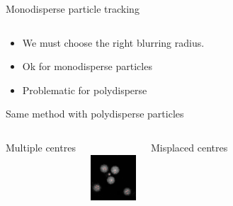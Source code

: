 \documentclass[xcolor=table]{beamer}
\begin{document}
\begin{frame}{Monodisperse particle tracking}
\begin{columns}[T]
	\end{columns}
	\begin{itemize}
	\item We must choose \alert{the right} blurring radius.
	\item Ok for monodisperse particles
	\item Problematic for polydisperse
	\end{itemize}
\end{frame}

\begin{frame}{Same method with polydisperse particles}
	\begin{columns}[T]
	\centering
	{\strut{}Multiple centres}\\
	\includegraphics[width=\textwidth]{dillute_smaller_blur0_5}
	\centering
	{\strut{}Misplaced centres}\\

\end{columns}
\end{frame}
\end{document}

